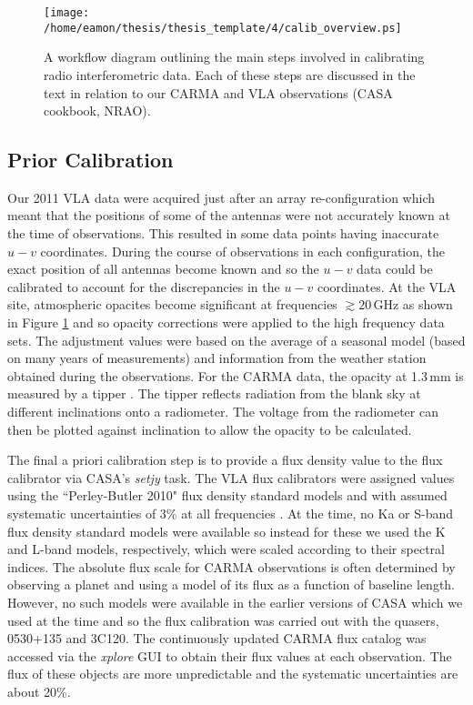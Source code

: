 \begin{figure}[hbt!]
\centering 
\texttt{[image: /home/eamon/thesis/thesis\_template/4/calib\_overview.ps]}  
\caption[Calibration workflow diagram.]{A workflow diagram outlining the main steps involved in calibrating radio interferometric data. Each of these steps are discussed in the text in relation to our CARMA and VLA observations (CASA cookbook, NRAO).}
\label{fig:4.3}
\end{figure}

\subsection{Prior Calibration}
Our 2011 VLA data were acquired just after an array re-configuration which meant that the positions of some of the antennas were not accurately known at the time of observations. This resulted in some data points having inaccurate $u-v$ coordinates. During the course of observations in each configuration, the exact position of all antennas become known and so the $u-v$ data could be calibrated to account for the discrepancies in the $u-v$ coordinates.  At the VLA site, atmospheric opacites become significant at frequencies $\gtrsim 20$\,GHz as shown in Figure \ref{fig:4.3} and so opacity corrections were applied to the high frequency data sets. The adjustment values were based on the average of a seasonal model (based on many years of measurements) and information from the weather station obtained during the observations. For the CARMA data, the opacity at 1.3\,mm is measured by a tipper \citep{white_2009}. The tipper reflects radiation from the blank sky at different inclinations onto a radiometer. The voltage from the radiometer can then be plotted against inclination to allow the opacity to be calculated. 

The final a priori calibration step is to provide a flux density value to the flux calibrator via CASA's \textit{setjy} task. The VLA flux calibrators were assigned values using the ``Perley-Butler 2010" flux density standard models  and with assumed systematic uncertainties of 3\% at all frequencies \citep{perley_2013}. At the time, no Ka or S-band flux density standard models were available so instead for these we used the K and L-band models, respectively, which were scaled according to their spectral indices. The absolute flux scale for CARMA observations is often determined by observing a planet and using a model of its flux as a function of baseline length. However, no such models were available in the earlier versions of CASA which we used at the time and so the flux calibration was carried out with the quasers, 0530+135 and 3C120. The continuously updated CARMA flux catalog was accessed via the \textit{xplore} GUI to obtain their flux values at each observation. The flux of these objects are more unpredictable and the systematic uncertainties are about 20\%.

